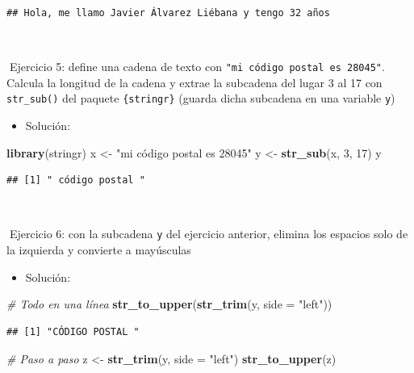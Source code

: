\documentclass[11pt,]{book}
\newenvironment{Shaded}{\begin{snugshade}}{\end{snugshade}}
\newcommand{\CommentTok}[1]{\textcolor[rgb]{0.37,0.37,0.37}{\textit{#1}}}
\newcommand{\DataTypeTok}[1]{\textcolor[rgb]{0.27,0.27,0.27}{#1}}
\newcommand{\DecValTok}[1]{\textcolor[rgb]{0.06,0.06,0.06}{#1}}
\newcommand{\KeywordTok}[1]{\textcolor[rgb]{0.27,0.27,0.27}{\textbf{#1}}}
\newcommand{\NormalTok}[1]{#1}
\newcommand{\StringTok}[1]{\textcolor[rgb]{0.5,0.5,0.5}{#1}}
\providecommand{\tightlist}{%
  \setlength{\itemsep}{0pt}\setlength{\parskip}{0pt}}
\begin{document}
\begin{verbatim}
## Hola, me llamo Javier Álvarez Liébana y tengo 32 años
\end{verbatim}

~

📝Ejercicio 5: define una cadena de texto con \texttt{"mi\ código\ postal\ es\ 28045"}. Calcula la longitud de la cadena y extrae la subcadena del lugar 3 al 17 con \texttt{str\_sub()} del paquete \texttt{\{stringr\}} (guarda dicha subcadena en una variable \texttt{y})

\begin{itemize}
\tightlist
\item
  Solución:
\end{itemize}

\begin{Shaded}
\begin{Highlighting}[]
\KeywordTok{library}\NormalTok{(stringr)}
\NormalTok{x <-}\StringTok{ "mi código postal es 28045"}
\NormalTok{y <-}\StringTok{ }\KeywordTok{str_sub}\NormalTok{(x, }\DecValTok{3}\NormalTok{, }\DecValTok{17}\NormalTok{)}
\NormalTok{y}
\end{Highlighting}
\end{Shaded}

\begin{verbatim}
## [1] " código postal "
\end{verbatim}

~

📝Ejercicio 6: con la subcadena \texttt{y} del ejercicio anterior, elimina los espacios solo de la izquierda y convierte a mayúsculas

\begin{itemize}
\tightlist
\item
  Solución:
\end{itemize}

\begin{Shaded}
\begin{Highlighting}[]
\CommentTok{# Todo en una línea}
\KeywordTok{str_to_upper}\NormalTok{(}\KeywordTok{str_trim}\NormalTok{(y, }\DataTypeTok{side =} \StringTok{"left"}\NormalTok{))}
\end{Highlighting}
\end{Shaded}

\begin{verbatim}
## [1] "CÓDIGO POSTAL "
\end{verbatim}

\begin{Shaded}
\begin{Highlighting}[]
\CommentTok{# Paso a paso}
\NormalTok{z <-}\StringTok{ }\KeywordTok{str_trim}\NormalTok{(y, }\DataTypeTok{side =} \StringTok{"left"}\NormalTok{)}
\KeywordTok{str_to_upper}\NormalTok{(z)}
\end{Highlighting}
\end{Shaded}
\end{document}
